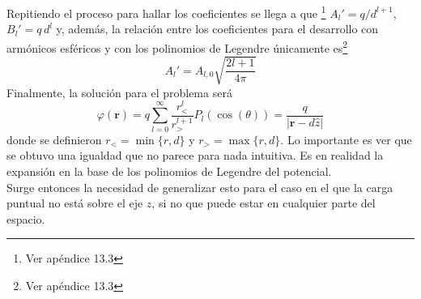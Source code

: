 Repitiendo el proceso para hallar los coeficientes se llega a que \footnote{Ver apéndice 13.3} $A_{l}' = q/d^{l+1}$, $B_{l}' = q\,d^{l}$ y, además, la relación entre los coeficientes para el desarrollo con armónicos esféricos y con los polinomios de Legendre únicamente es\footnote{Ver apéndice 13.3}
\begin{equation*}
    A_{l}' = A_{l,0}\sqrt{\frac{2l + 1}{4\pi }}
\end{equation*}
Finalmente, la solución para el problema será
\begin{equation*}
    \varphi(\textbf{r}) = q \sum\limits_{l=0}^{\infty}
    \frac{r_{<}^{l}}{r_{>}^{l+1}}
    P_{l}(\cos{(\theta)})
    = \frac{q}{|\textbf{r}-d\hat{z}|}
\end{equation*}
donde se definieron $r_{<} = \min\{r,d\}$ y $r_{>} = \max\{r,d\}$. Lo importante es ver que se obtuvo una igualdad que no parece para nada intuitiva. Es en realidad la expansión en la base de los polinomios de Legendre del potencial.\\
\indent Surge entonces la necesidad de generalizar esto para el caso en el que la carga puntual no está sobre el eje $z$, si no que puede estar en cualquier parte del espacio.




